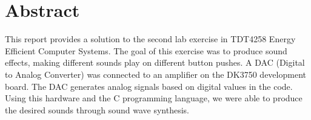 \section{Abstract}

This report provides a solution to the second lab exercise in TDT4258 Energy Efficient Computer Systems.
The goal of this exercise was to produce sound effects, making different sounds play on different button pushes.
A DAC (Digital to Analog Converter) was connected to an amplifier on the DK3750 development board. The DAC generates analog signals based on digital values in the code. Using this hardware and the C programming language, we were able to produce the desired sounds through sound wave synthesis.
